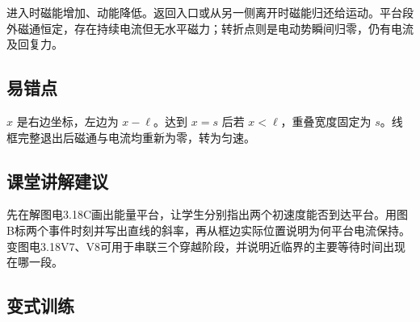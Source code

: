 \documentclass[UTF8,fontset=fandol,a4paper,11pt]{ctexart}
\begin{document}
进入时磁能增加、动能降低。返回入口或从另一侧离开时磁能归还给运动。平台段外磁通恒定，存在持续电流但无水平磁力；转折点则是电动势瞬间归零，仍有电流及回复力。



\subsection*{易错点}

$x$ 是右边坐标，左边为 $x-\ell$。达到 $x=s$ 后若 $x<\ell$，重叠宽度固定为 $s$。线框完整退出后磁通与电流均重新为零，转为匀速。



\subsection*{课堂讲解建议}

先在解图电3.18C画出能量平台，让学生分别指出两个初速度能否到达平台。用图B标两个事件时刻并写出直线的斜率，再从框边实际位置说明为何平台电流保持。变图电3.18V7、V8可用于串联三个穿越阶段，并说明近临界的主要等待时间出现在哪一段。


\subsection*{变式训练}
\end{document}
